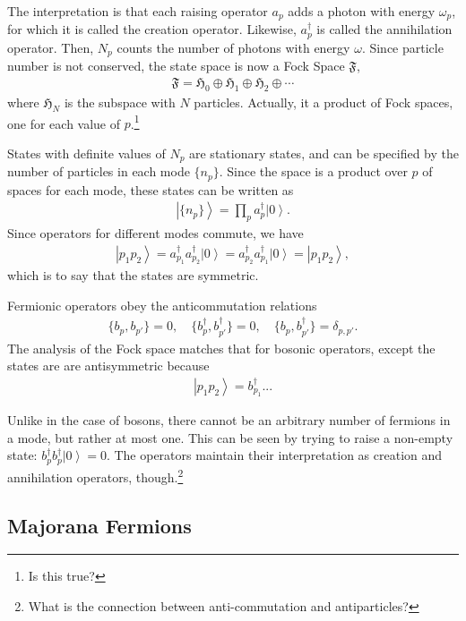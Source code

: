 \documentclass[12pt]{article} %
\newcommand{\om}{\omega}
\newcommand{\ket}[1]{\left|#1\right\rangle}
\begin{document}
The interpretation is that each raising operator $a_p$ adds a photon with energy $\om_p$, for which it is called the creation operator. Likewise, $a_p^\dag$ is called the annihilation operator. Then, $N_p$ counts the number of photons with energy $\om$. Since particle number is not conserved, the state space is now a  Fock Space $\mathfrak{F}$,
\begin{align}
\mathfrak{F} = \mathfrak{H}_0 \oplus \mathfrak{H}_1 \oplus \mathfrak{H}_2 
\oplus \cdots
\end{align}
where $\mathfrak{H}_N$ is the subspace with $N$ particles. Actually, it a product of Fock spaces, one for each value of $p$.\footnote{Is this true?}

States with definite values of $N_p$ are stationary states, and can be specified by the number of particles in each mode $\{n_p\}$. Since the space is a product over $p$ of spaces for each mode, these states can be written as
\begin{align}
\ket{\{n_p\}} = \prod_pa_p^\dag\ket{0}.
\end{align}
Since operators for different modes commute, we have
\begin{align}
\ket{p_1p_2} = a^\dag_{p_1}a^\dag_{p_2}\ket{0} = a^\dag_{p_2} a^\dag_{p_1} \ket{0} = \ket{p_1p_2},
\end{align}
which is to say that the states are symmetric.

Fermionic operators obey the anticommutation relations
\begin{align}
\{b_p, b_{p'}\} = 0,\quad \{b^\dag_p, b^\dag_{p'}\} = 0,\quad \{b_p, b^\dag_{p'}\} = \delta_{p,p'}.
\end{align}
The analysis of the Fock space matches that for bosonic operators, except the states are are antisymmetric because
\begin{align}
\ket{p_1p_2} = b^\dag_{p_1}...
\end{align}

Unlike in the case of bosons, there cannot be an arbitrary number of fermions in a mode, but rather at most one. This can be seen by trying to raise a non-empty state: $b_p^\dag b^\dag_p\ket{0} = 0$. The operators maintain their interpretation as creation and annihilation operators, though.\footnote{What is the connection between anti-commutation and antiparticles?}

\subsection{Majorana Fermions} \emph{}
\end{document}

